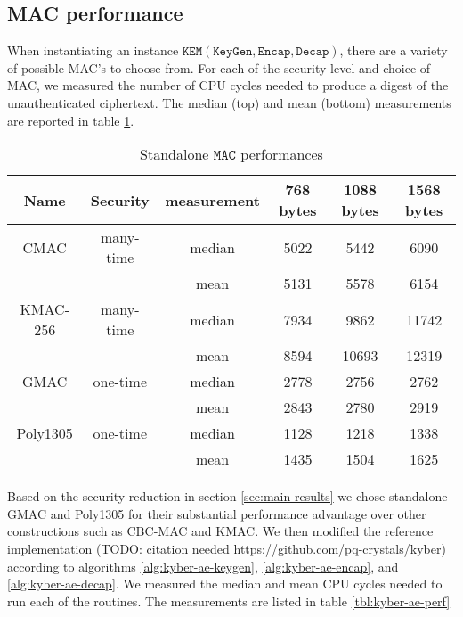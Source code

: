 \documentclass[floatrow,journal=tches,submission]{iacrtrans}
\newcommand{\keygen}{\texttt{KeyGen}}
\newcommand{\kem}{\texttt{KEM}}
\newcommand{\encap}{\texttt{Encap}}
\newcommand{\decap}{\texttt{Decap}}
\newcommand{\mac}{\texttt{MAC}}
\begin{document}
% 

\subsection{MAC performance}\label{sec:mac-performance}
When instantiating an instance $\kem(\keygen, \encap, \decap)$, there are a variety of possible MAC's to choose from. For each of the security level and choice of MAC, we measured the number of CPU cycles needed to produce a digest of the unauthenticated ciphertext. The median (top) and mean (bottom) measurements are reported in table \ref{tbl:standalone-mac-perf}.

\begin{table}[H]
    \centering
    \begin{tabular}{|c|c|c|c|c|c|}
        \hline
        Name & Security & measurement & 768 bytes & 1088 bytes & 1568 bytes \\
        \hline
        CMAC & many-time & median & 5022 & 5442 & 6090 \\
        & & mean & 5131 & 5578 & 6154 \\
        \hline
        KMAC-256 & many-time & median & 7934 & 9862 & 11742 \\
        & & mean & 8594 & 10693 & 12319 \\
        \hline
        GMAC & one-time & median & 2778 & 2756 & 2762 \\
        & & mean & 2843 & 2780 & 2919 \\
        \hline
        Poly1305 & one-time & median & 1128 & 1218 & 1338 \\
        & & mean & 1435 & 1504 & 1625 \\
        \hline
    \end{tabular}
    \caption{Standalone $\mac$ performances}\label{tbl:standalone-mac-perf}
\end{table}

Based on the security reduction in section \ref{sec:main-results} we chose standalone GMAC and Poly1305 for their substantial performance advantage over other constructions such as CBC-MAC and KMAC. We then modified the reference implementation (TODO: citation needed https://github.com/pq-crystals/kyber) according to algorithms \ref{alg:kyber-ae-keygen}, \ref{alg:kyber-ae-encap}, and \ref{alg:kyber-ae-decap}. We measured the median and mean CPU cycles needed to run each of the routines. The measurements are listed in table \ref{tbl:kyber-ae-perf}
\end{document}
